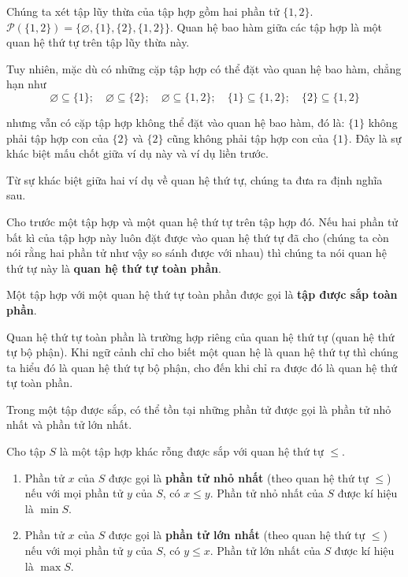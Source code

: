 \begin{example}
    Chúng ta xét tập lũy thừa của tập hợp gồm hai phần tử $\{ 1, 2 \}$. $\mathcal{P}(\{ 1, 2 \}) = \{ \varnothing, \{ 1 \}, \{ 2 \}, \{ 1, 2 \} \}$. Quan hệ bao hàm giữa các tập hợp là một quan hệ thứ tự trên tập lũy thừa này.

    Tuy nhiên, mặc dù có những cặp tập hợp có thể đặt vào quan hệ bao hàm, chẳng hạn như
    \[
        \varnothing\subseteq \{ 1 \};\quad \varnothing\subseteq \{ 2 \};\quad \varnothing\subseteq\{ 1, 2 \};\quad \{ 1 \}\subseteq\{ 1, 2 \};\quad \{ 2 \}\subseteq\{ 1, 2 \}
    \]

    nhưng vẫn có cặp tập hợp không thể đặt vào quan hệ bao hàm, đó là: $\{ 1 \}$ không phải tập hợp con của $\{ 2 \}$ và $\{ 2 \}$ cũng không phải tập hợp con của $\{ 1 \}$. Đây là sự khác biệt mấu chốt giữa ví dụ này và ví dụ liền trước.
\end{example}

Từ sự khác biệt giữa hai ví dụ về quan hệ thứ tự, chúng ta đưa ra định nghĩa sau.
\begin{definition}
    Cho trước một tập hợp và một quan hệ thứ tự trên tập hợp đó. Nếu hai phần tử bất kì của tập hợp này luôn đặt được vào quan hệ thứ tự đã cho (chúng ta còn nói rằng hai phần tử như vậy so sánh được với nhau) thì chúng ta nói quan hệ thứ tự này là \textbf{quan hệ thứ tự toàn phần}.

    \noindent Một tập hợp với một quan hệ thứ tự toàn phần được gọi là \textbf{tập được sắp toàn phần}.
\end{definition}

Quan hệ thứ tự toàn phần là trường hợp riêng của quan hệ thứ tự (quan hệ thứ tự bộ phận). Khi ngữ cảnh chỉ cho biết một quan hệ là quan hệ thứ tự thì chúng ta hiểu đó là quan hệ thứ tự bộ phận, cho đến khi chỉ ra được đó là quan hệ thứ tự toàn phần.

Trong một tập được sắp, có thể tồn tại những phần tử được gọi là phần tử nhỏ nhất và phần tử lớn nhất.
\begin{definition}
    Cho tập $S$ là một tập hợp khác rỗng được sắp với quan hệ thứ tự $\leq$.
    \begin{enumerate}[label={(\roman*)}]
        \item Phần tử $x$ của $S$ được gọi là \textbf{phần tử nhỏ nhất} (theo quan hệ thứ tự $\leq$) nếu với mọi phần tử $y$ của $S$, có $x\leq y$. Phần tử nhỏ nhất của $S$ được kí hiệu là $\min S$.
        \item Phần tử $x$ của $S$ được gọi là \textbf{phần tử lớn nhất} (theo quan hệ thứ tự $\leq$) nếu với mọi phần tử $y$ của $S$, có $y\leq x$. Phần tử lớn nhất của $S$ được kí hiệu là $\max S$.
    \end{enumerate}
\end{definition}

